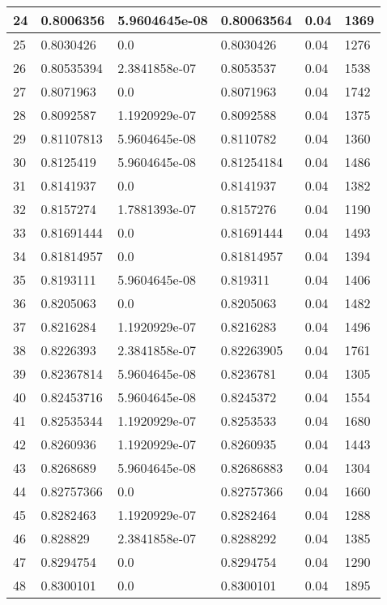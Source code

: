 \begin{longtable}{|l|l|l|l|l|l|}
24 & 0.8006356 & 5.9604645e-08 & 0.80063564 & 0.04 & 1369 \\ \hline 
25 & 0.8030426 & 0.0 & 0.8030426 & 0.04 & 1276 \\ \hline 
26 & 0.80535394 & 2.3841858e-07 & 0.8053537 & 0.04 & 1538 \\ \hline 
27 & 0.8071963 & 0.0 & 0.8071963 & 0.04 & 1742 \\ \hline 
28 & 0.8092587 & 1.1920929e-07 & 0.8092588 & 0.04 & 1375 \\ \hline 
29 & 0.81107813 & 5.9604645e-08 & 0.8110782 & 0.04 & 1360 \\ \hline 
30 & 0.8125419 & 5.9604645e-08 & 0.81254184 & 0.04 & 1486 \\ \hline 
31 & 0.8141937 & 0.0 & 0.8141937 & 0.04 & 1382 \\ \hline 
32 & 0.8157274 & 1.7881393e-07 & 0.8157276 & 0.04 & 1190 \\ \hline 
33 & 0.81691444 & 0.0 & 0.81691444 & 0.04 & 1493 \\ \hline 
34 & 0.81814957 & 0.0 & 0.81814957 & 0.04 & 1394 \\ \hline 
35 & 0.8193111 & 5.9604645e-08 & 0.819311 & 0.04 & 1406 \\ \hline 
36 & 0.8205063 & 0.0 & 0.8205063 & 0.04 & 1482 \\ \hline 
37 & 0.8216284 & 1.1920929e-07 & 0.8216283 & 0.04 & 1496 \\ \hline 
38 & 0.8226393 & 2.3841858e-07 & 0.82263905 & 0.04 & 1761 \\ \hline 
39 & 0.82367814 & 5.9604645e-08 & 0.8236781 & 0.04 & 1305 \\ \hline 
40 & 0.82453716 & 5.9604645e-08 & 0.8245372 & 0.04 & 1554 \\ \hline 
41 & 0.82535344 & 1.1920929e-07 & 0.8253533 & 0.04 & 1680 \\ \hline 
42 & 0.8260936 & 1.1920929e-07 & 0.8260935 & 0.04 & 1443 \\ \hline 
43 & 0.8268689 & 5.9604645e-08 & 0.82686883 & 0.04 & 1304 \\ \hline 
44 & 0.82757366 & 0.0 & 0.82757366 & 0.04 & 1660 \\ \hline 
45 & 0.8282463 & 1.1920929e-07 & 0.8282464 & 0.04 & 1288 \\ \hline 
46 & 0.828829 & 2.3841858e-07 & 0.8288292 & 0.04 & 1385 \\ \hline 
47 & 0.8294754 & 0.0 & 0.8294754 & 0.04 & 1290 \\ \hline 
48 & 0.8300101 & 0.0 & 0.8300101 & 0.04 & 1895 \\ \hline 

\end{longtable}
